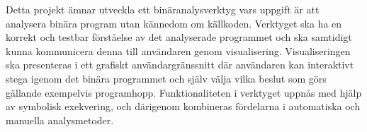 Detta projekt ämnar utveckla ett binäranalysverktyg vars uppgift är att
analysera binära program utan kännedom om källkoden. Verktyget ska ha en korrekt
och testbar förståelse av det analyserade programmet och ska samtidigt kunna
kommunicera denna till användaren genom visualisering. Visualiseringen ska
presenteras i ett grafiskt användargränssnitt där användaren kan interaktivt
stega igenom det binära programmet och själv välja vilka beslut som görs 
gällande exempelvis programhopp. Funktionaliteten i verktyget uppnås med hjälp
av symbolisk exekvering, och därigenom kombineras fördelarna i automatiska och 
manuella analysmetoder.

